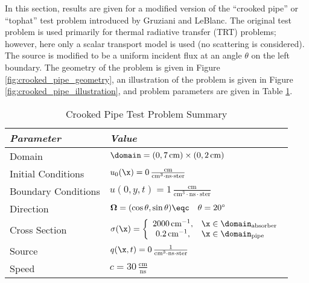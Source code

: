 In this section, results are given for a modified version of the ``crooked pipe''
or ``tophat'' test problem introduced by Gruziani and
LeBlanc\cite{gruziani2000}\cite{long2014}. The original test problem is
used primarily for thermal radiative transfer (TRT) problems; however, here
only a scalar transport model is used (no scattering is considered). The
source is modified to be a uniform incident flux at an angle $\theta$ on the left
boundary. The geometry of the problem is given in Figure
\ref{fig:crooked_pipe_geometry}, an illustration of the problem is given
in Figure \ref{fig:crooked_pipe_illustration}, and problem parameters are given
in Table \ref{tab:crooked_pipe_parameters}.

\begin{table}[htb]\caption{Crooked Pipe Test Problem Summary}
\label{tab:crooked_pipe_parameters}
\centering
\begin{tabular}{l l}\toprule
\emph{Parameter} & \emph{Value}\\\midrule
Domain & $\domain = (0,7\,\text{cm})\times(0,2\,\text{cm})$\\
Initial Conditions & $u_0(\x)=0\,
  \frac{\text{cm}}{\text{cm}^3\cdot\text{ns}\cdot\text{ster}}$\\
Boundary Conditions & $u(0,y,t)=1\,
  \frac{\text{cm}}{\text{cm}^3\cdot\text{ns}\cdot\text{ster}}$\\
Direction & $\mathbf{\Omega} = (\cos\theta, \sin\theta)\eqc
  \quad \theta=20^\circ$\\
Cross Section & $\sigma(\x)=\left\{\begin{array}{c l}
   2000\,\text{cm}^{-1}, & \x\in \domain_{\text{absorber}}\\
   0.2\,\text{cm}^{-1}, & \x\in \domain_{\text{pipe}}\end{array}\right.$\\
Source & $q(\x,t)=0\,
  \frac{1}{\text{cm}^3\cdot\text{ns}\cdot\text{ster}}$\\
Speed & $c=30\,\frac{\text{cm}}{\text{ns}}$\\
\bottomrule\end{tabular}
\end{table}
